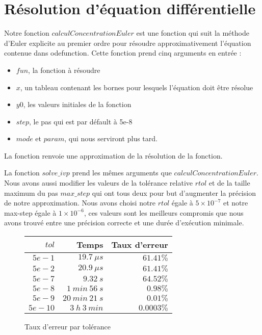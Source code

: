 \documentclass[11pt]{report}
\begin{document}
        \section{Résolution d'équation différentielle}
            Notre fonction $calculConcentrationEuler$ est une fonction qui suit la méthode d'Euler explicite au premier ordre
            pour résoudre approximativement l'équation contenue dans odefunction.
            Cette fonction prend cinq arguments en entrée :
            \begin{itemize}
                \item $fun$, la fonction à résoudre
                \item $x$, un tableau contenant les bornes pour lesquels l'équation doit être résolue
                \item $y0$, les valeurs initiales de la fonction
                \item $step$, le pas qui est par défault à 5e-8
                \item $mode$ et $param$, qui nous serviront plus tard.
            \end{itemize}
            La fonction renvoie une approximation de la résolution de la fonction.
            \par
            La fonction $solve\_ivp$ prend les mêmes arguments que $calculConcentrationEuler$. 
            Nous avons aussi modifier les valeurs de la tolérance relative $rtol$ et de la taille maximum du pas $max\_step$
            qui ont tous deux pour but d'augmenter la précision de notre approximation.
            Nous avons choisi notre $rtol$ égale à $5\times10^{-7}$ et notre max-step égale à $1\times10^{-6}$,
            ces valeurs sont les meilleurs compromis que nous avons trouvé entre une précision correcte
            et une durée d'exécution minimale.
            \par
            \begin{figure}
                \centering
                \begin{tabular}{|r|r|r|}
                    \hline
                    $tol$   & Temps             & Taux d'erreur\\
                    \hline
                    $5e-1$  & $19.7\ \mu s$     & $61.41\%$\\
                    $5e-2$  & $20.9\ \mu s$     & $61.41\%$\\
                    $5e-7$  & $9.32\ s$         & $64.52\%$\\
                    $5e-8$  & $1\ min\ 56\ s$   & $0.98\%$\\
                    $5e-9$  & $20\ min\ 21\ s$  & $0.01\%$\\
                    $5e-10$ & $3\ h\ 3\ min$    & $0.0003\%$\\
                    \hline
                \end{tabular}
                \caption{Taux d'erreur par tolérance}
                \label{tab:tol}
            \end{figure}
\end{document}
